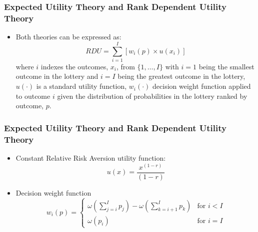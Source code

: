 \documentclass{beamer}
\begin{document}
\begin{frame}
\frametitle{Expected Utility Theory and Rank Dependent Utility Theory}
\begin{itemize}
	\item Both theories can be expressed as:
	\begin{equation}
		\label{eq4:RDU}
		RDU = \sum_{i=1}^{I} \left[ w_i(p) \times u(x_i) \right]
	\end{equation}
\noindent where $i$ indexes the outcomes, $x_i$, from $\{1,\ldots,I\}$ with $i=1$ being the smallest outcome in the lottery and $i=I$ being the greatest outcome in the lottery, $u(\cdot)$ is a standard utility function, $w_i(\cdot)$ decision weight function applied to outcome $i$ given the distribution of probabilities in the lottery ranked by outcome, $p$.
\end{itemize}
\end{frame}

\begin{frame}
\frametitle{Expected Utility Theory and Rank Dependent Utility Theory}
\begin{itemize}
	\item Constant Relative Risk Aversion utility function:
	\begin{equation}
		\label{eq4:CRRA}
		u(x) = \frac{x^{(1-r)}}{(1-r)}
	\end{equation}
	\item Decision weight function
	\begin{equation}
		\label{eq4:dweight}
		w_i(p) =
		\begin{cases}
			\omega\left(\displaystyle\sum_{j=i}^I p_j\right) - \omega\left(\displaystyle\sum_{k=i+1}^I p_k\right) & \text{for } i<I \\
			\omega(p_i) & \text{for } i = I
		\end{cases}
	\end{equation}
\end{itemize}
\end{frame}
\end{document}
